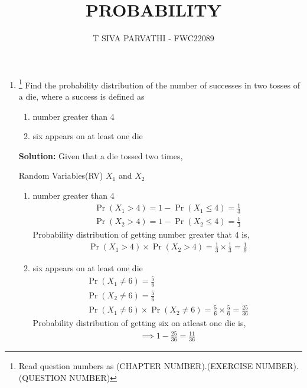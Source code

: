 \documentclass{article}
\providecommand{\pr}[1]{\ensuremath{\Pr\left(#1\right)}}
\newcommand{\solution}{\noindent \textbf{Solution: }}
\begin{document}
\title{PROBABILITY}
\author{\Large T SIVA PARVATHI - FWC22089}
\date{}

\maketitle
\begin{enumerate}[label=13.\arabic{enumi}.\arabic{enumii}]%
\setcounter{enumi}{3}
\setcounter{enumii}{5}

\item \footnote{Read question numbers as (CHAPTER NUMBER).(EXERCISE NUMBER).(QUESTION NUMBER)}
Find the probability distribution of the number of successes in two tosses of a die, where a success is defined as
\begin{enumerate}
\item number greater than 4
\item six appears on at least one die
\end{enumerate}

\solution
Given that a die tossed two times,
\begin{table}[h]\centering
	
	 \caption{Random Variables(RV) $X_1$ and $X_2$}\label{table:1}
\end{table}

\begin{enumerate}
\item number greater than 4
\begin{align}
\pr{X_1>4}=1-\pr{X_1\le4}=\frac{1}{3}\\
\pr{X_2>4}=1-\pr{X_2\le4}=\frac{1}{3}
\end{align}
Probability distribution of getting number greater that 4 is,
\begin{align}
\pr{X_1>4} \times \pr{X_2>4} = \frac{1}{3} \times \frac{1}{3}=\frac{1}{9}
\end{align}
\item six appears on at least one die
\begin{align}
\pr{X_1\neq6}=\frac{5}{6}\\
\pr{X_2\neq6}=\frac{5}{6}\\
\pr{X_1\neq6} \times \pr{X_2\neq6} = \frac{5}{6} \times \frac{5}{6}=\frac{25}{36}
\end{align}
Probability distribution of getting six on atleast one die is,
\begin{align}
\implies 1-\frac{25}{36} = \frac{11}{36}
\end{align}
\end{enumerate}
\end{enumerate}
\end{document}

